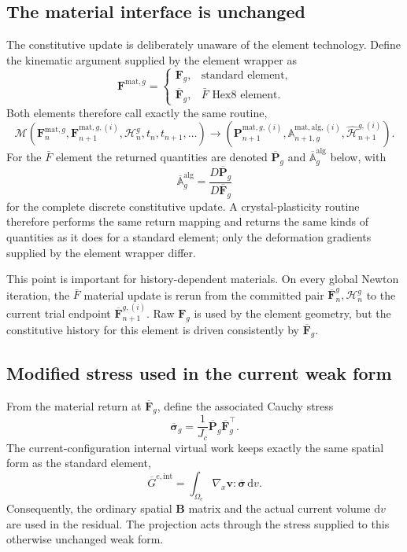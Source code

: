 \documentclass[11pt,a4paper]{article}
\newcommand{\bs}[1]{\boldsymbol{#1}}
\newcommand{\dd}{\mathrm{d}}
\newcommand{\F}{\bs{F}}
\newcommand{\Pstress}{\bs{P}}
\newcommand{\Fb}{\overline{\bs{F}}}
\newcommand{\Pb}{\overline{\bs{P}}}
\newcommand{\Ab}{\overline{\mathbb{A}}^{\mathrm{alg}}}
\newcommand{\sigb}{\overline{\bs{\sigma}}}
\newcommand{\vct}[1]{\mathbf{#1}}
\begin{document}
\subsection{The material interface is unchanged}
\label{sec:fbar-interface}

The constitutive update is deliberately unaware of the element technology. Define the kinematic argument supplied by the element wrapper as
\begin{equation}
\F^{\mathrm{mat},g}
=
\begin{cases}
\F_g,&\text{standard element},\\
\Fb_g,&\text{$\bar F$ Hex8 element}.
\end{cases}
\label{eq:Fmat-wrapper}
\end{equation}
Both elements therefore call exactly the same routine,
\begin{equation}
\boxed{
\mathcal M
\left(
\F_n^{\mathrm{mat},g},
\F_{n+1}^{\mathrm{mat},g,(i)},
\mathcal H_n^g,t_n,t_{n+1},\ldots
\right)
\rightarrow
\left(
\Pstress_{n+1}^{\mathrm{mat},g,(i)},
\mathbb A_{n+1,g}^{\mathrm{mat,alg},(i)},
\widehat{\mathcal H}_{n+1}^{g,(i)}
\right).
}
\label{eq:fbar-same-material-interface}
\end{equation}
For the $\bar F$ element the returned quantities are denoted $\Pb_g$ and $\Ab_g$ below, with
\begin{equation}
\Ab_g
=
\frac{D\Pb_g}{D\Fb_g}
\end{equation}
for the complete discrete constitutive update. A crystal-plasticity routine therefore performs the same return mapping and returns the same kinds of quantities as it does for a standard element; only the deformation gradients supplied by the element wrapper differ.

This point is important for history-dependent materials. On every global Newton iteration, the $\bar F$ material update is rerun from the committed pair $\Fb_n^g,\mathcal H_n^g$ to the current trial endpoint $\Fb_{n+1}^{g,(i)}$. Raw $\F_g$ is used by the element geometry, but the constitutive history for this element is driven consistently by $\Fb_g$.

\subsection{Modified stress used in the current weak form}

From the material return at $\Fb_g$, define the associated Cauchy stress
\begin{equation}
\boxed{
\sigb_g
=
\frac{1}{J_c}\Pb_g\Fb_g^\top.
}
\label{eq:fbar-cauchy}
\end{equation}
The current-configuration internal virtual work keeps exactly the same spatial form as the standard element,
\begin{equation}
\boxed{
\overline G^{e,\mathrm{int}}
=
\int_{\Omega_e}
\nabla_x\bs v:\sigb\,\dd v.
}
\label{eq:fbar-current-weak}
\end{equation}
Consequently, the ordinary spatial $\vct B$ matrix and the actual current volume $\dd v$ are used in the residual. The projection acts through the stress supplied to this otherwise unchanged weak form.
\end{document}
